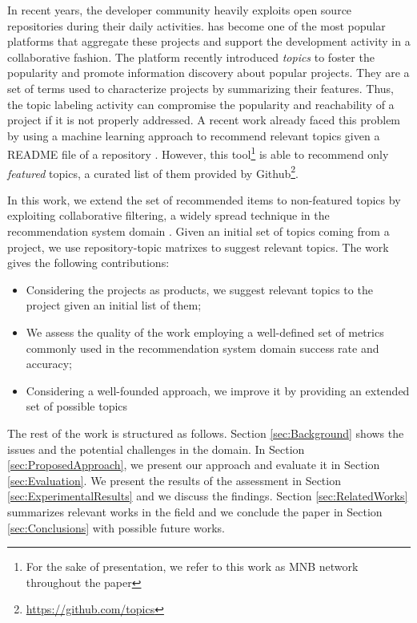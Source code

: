In recent years, the developer community heavily exploits open source repositories during their daily activities. \GH has become one of the most
popular platforms that aggregate these projects and
support the development activity in a collaborative fashion.
%
The platform recently introduced \emph{topics} to foster the popularity and promote information discovery about popular projects. They are a set of terms used to characterize projects by summarizing their features.  
Thus, the topic labeling activity can compromise the popularity and reachability of a project if it is not properly addressed. A recent work already faced this problem by using a machine learning approach to recommend relevant topics given a README file of a repository  \cite{MNB}. However, this tool\footnote{For the sake of presentation, we refer to this work as MNB network throughout the paper} is able to recommend only \emph{featured} topics, a curated list of them provided by Github\footnote{\url{https://github.com/topics}}.

In this work, we extend the set of recommended items to non-featured topics by exploiting collaborative filtering, a widely spread technique in the recommendation system domain \cite{Schafer:2007:CFR:1768197.1768208}. Given an initial set of topics coming from a \GH project, we use repository-topic matrixes to suggest relevant topics.
The work gives the following contributions:
\begin{itemize}
\item Considering the \GH projects as products, we suggest relevant topics to the project given an initial list of them;
\item We assess the quality of the work employing a well-defined set of metrics commonly used in the recommendation system domain \ie success rate and accuracy;
\item Considering a well-founded approach, we improve it by providing an extended set of possible topics  
\end{itemize}

The rest of the work is structured as follows. Section \ref{sec:Background} shows the issues and the potential challenges in the domain. In Section \ref{sec:ProposedApproach}, we present our approach and evaluate it in Section \ref{sec:Evaluation}. We present the results of the assessment in Section \ref{sec:ExperimentalResults} and we discuss the findings. Section \ref{sec:RelatedWorks} summarizes relevant works in the field and we conclude the paper in Section \ref{sec:Conclusions} with possible future works.
